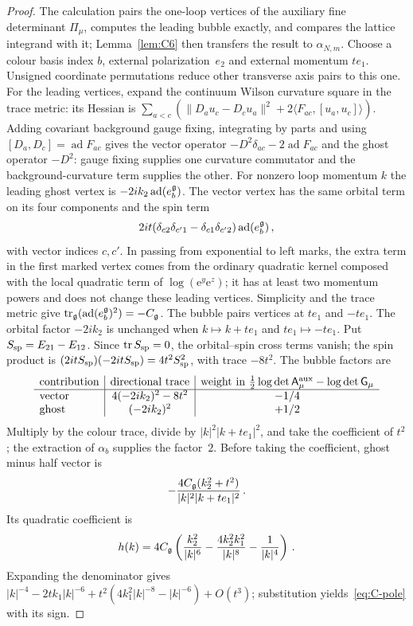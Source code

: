 \begin{proof}
The calculation pairs the one-loop vertices of the auxiliary fine determinant $\Pi_\mu$, computes the leading bubble exactly, and compares the lattice integrand with it; Lemma~\ref{lem:C6} then transfers the result to $\alpha_{N,m}$. Choose a colour basis index $b$, external polarization~$e_2$ and external momentum $te_1$. Unsigned coordinate permutations reduce other transverse axis pairs to this one. For the leading vertices, expand the continuum Wilson curvature square in the trace metric: its Hessian is $\sum_{a<c}(\|D_au_c-D_cu_a\|^2+2\langle F_{ac},[u_a,u_c]\rangle)$. Adding covariant background gauge fixing, integrating by parts and using $[D_a,D_c]=\operatorname{ad}F_{ac}$ gives the vector operator $-D^2\delta_{ac}-2\operatorname{ad}F_{ac}$ and the ghost operator $-D^2$: gauge fixing supplies one curvature commutator and the background-curvature term supplies the other. For nonzero loop momentum $k$ the leading ghost vertex is $-2ik_2\operatorname{ad}(e_b^{\mathfrak{g}})$. The vector vertex has the same orbital term on its four components and the spin term
\begin{equation*}
2it(\delta_{c2}\delta_{c'1}-\delta_{c1}\delta_{c'2})\operatorname{ad}(e_b^{\mathfrak{g}})\,,
\end{equation*}
with vector indices $c,c'$. In passing from exponential to left marks, the extra term in the first marked vertex comes from the ordinary quadratic kernel composed with the local quadratic term of $\log(\mathrm e^y\mathrm e^z)$; it has at least two momentum powers and does not change these leading vertices. Simplicity and the trace metric give $\operatorname{tr}_{\mathfrak{g}}(\operatorname{ad}(e_b^{\mathfrak{g}})^2)=-C_{\mathfrak{g}}$. The bubble pairs vertices at $te_1$ and $-te_1$. The orbital factor $-2ik_2$ is unchanged when $k\mapsto k+te_1$ and $te_1\mapsto-te_1$. Put $S_{\rm sp}=E_{21}-E_{12}$. Since $\operatorname{tr} S_{\rm sp}=0$, the orbital--spin cross terms vanish; the spin product is $(2itS_{\rm sp})(-2itS_{\rm sp})=4t^2S_{\rm sp}^2$, with trace $-8t^2$. The bubble factors are
\begin{equation*}
\begin{array}{l|c|c}
\text{contribution}&\text{directional trace}&\text{weight in }\tfrac12\log\det\mathsf A^{\rm aux}_\mu-\log\det\mathsf G_\mu\\\hline
\text{vector}&4(-2ik_2)^2-8t^2&-1/4\\
\text{ghost}&(-2ik_2)^2&+1/2
\end{array}
\end{equation*}
Multiply by the colour trace, divide by $|k|^2|k+te_1|^2$, and take the coefficient of $t^2$; the extraction of $\alpha_b$ supplies the factor~$2$. Before taking the coefficient, ghost minus half vector is
\begin{equation*}
-\frac{4C_{\mathfrak{g}}(k_2^2+t^2)}{|k|^2|k+te_1|^2}\,.
\end{equation*}
Its quadratic coefficient is
\begin{equation}\label{eq:C-pole}
h(k)=4C_{\mathfrak{g}}\left(\frac{k_2^2}{|k|^6}-\frac{4k_2^2k_1^2}{|k|^8}-\frac1{|k|^4}\right)\,.
\end{equation}
Expanding the denominator gives $|k|^{-4}-2tk_1|k|^{-6}+t^2(4k_1^2|k|^{-8}-|k|^{-6})+O(t^3)$; substitution yields~\eqref{eq:C-pole} with its sign.


\end{proof}
